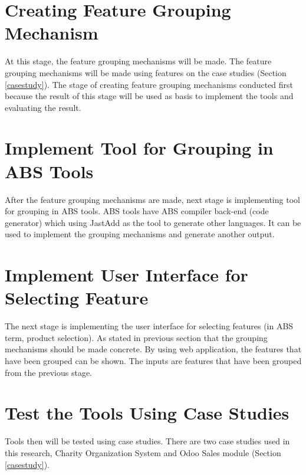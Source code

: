 \section{Creating Feature Grouping Mechanism}
At this stage, the feature grouping mechanisms will be made. The feature grouping mechanisms will be made using features on the case studies (Section \ref{casestudy}). The stage of creating feature grouping mechanisms conducted first because the result of this stage will be used as basis to implement the tools and evaluating the result.

\section{Implement Tool for Grouping in ABS Tools}
After the feature grouping mechanisms are made, next stage is implementing tool for grouping in ABS tools. ABS tools have ABS compiler back-end (code generator) which using JastAdd as the tool to generate other languages. It can be used to implement the grouping mechanisms and generate another output.

\section{Implement User Interface for Selecting Feature}
The next stage is implementing the user interface for selecting features (in ABS term, product selection). As stated in previous section that the grouping mechanisms should be made concrete. By using web application, the features that have been grouped can be shown. The inputs are features that have been grouped from the previous stage.

\section{Test the Tools Using Case Studies}
Tools then will be tested using case studies. There are two case studies used in this research, Charity Organization System and Odoo Sales module (Section \ref{casestudy}). 

